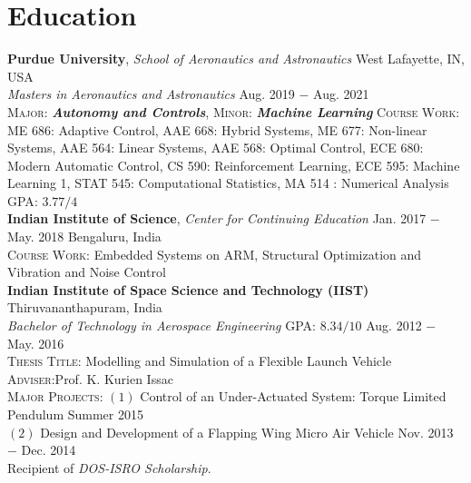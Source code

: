 \documentclass[letterpaper,10pt]{article}
\begin{document}
\section{Education}
\noindent \textbf{Purdue University}, \textit{School of Aeronautics and Astronautics} \hfill West Lafayette, IN, USA \\
\textit{Masters in Aeronautics and Astronautics} \hfill Aug. 2019 $-$ Aug. 2021\\
\textsc{Major}: \textit{\textbf{Autonomy and Controls}}, \textsc{Minor}: \textit{\textbf{Machine Learning}}
\textsc{Course Work}: ME 686: Adaptive Control, AAE 668: Hybrid Systems, ME 677: Non-linear Systems, AAE 564: Linear Systems,  AAE 568: Optimal Control, ECE 680: Modern Automatic Control, CS 590: Reinforcement Learning, ECE 595: Machine Learning 1, STAT 545: Computational Statistics, MA 514 : Numerical Analysis
\hfill \textsc{GPA}: $3.77/4$\\

\vspace{5pt}
\noindent \textbf{Indian Institute of Science}, \textit{Center for Continuing Education} \hfill Jan. 2017 $-$ May. 2018  \hfill Bengaluru, India \\
\textsc{Course Work:} Embedded Systems on ARM, Structural Optimization and Vibration and Noise Control \\

\vspace{5pt}
\noindent \textbf{Indian Institute of Space Science and Technology (IIST)} \hfill Thiruvananthapuram, India\\
\textit{Bachelor of Technology in Aerospace Engineering} \hfill \textsc{GPA}: $8.34/10$ \hfill Aug. 2012 $-$ May. 2016 \\
\textsc{Thesis Title}: Modelling and Simulation of a Flexible Launch Vehicle
\hfill \textsc{Adviser}:Prof. K. Kurien Issac \\
\textsc{Major Projects}: $(1)$ Control of an Under-Actuated System: Torque Limited Pendulum \hfill {Summer 2015}\\
$(2)$ Design and Development of a Flapping Wing Micro Air Vehicle \hfill {Nov. 2013 $-$ Dec. 2014}\\
Recipient of \textit{DOS-ISRO Scholarship}.


\end{document}
